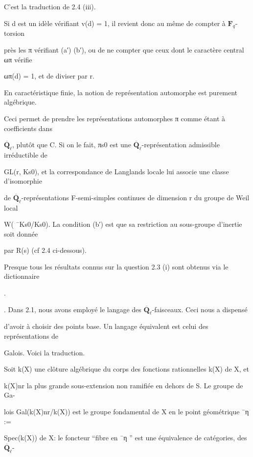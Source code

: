 \documentclass[11pt]{article}
\begin{document}
\noindent C’est la traduction de 2.4 (iii).\par
\noindent Si d est un idèle vérifiant v(d) = 1, il revient donc au même de compter à \(\mathbf F_q\)-torsion\par
\noindent près les π vérifiant (a′) (b′), ou de ne compter que ceux dont le caractère central ωπ vérifie\par
\noindent ωπ(d) = 1, et de diviser par r.\par
\medskip
\noindent En caractéristique finie, la notion de représentation automorphe est purement algébrique.\par
\noindent Ceci permet de prendre les représentations automorphes π comme étant à coefficients dans\par
\noindent \(\overline{\mathbf Q}_{\ell}\), plutôt que C. Si on le fait, πs0 est une \(\overline{\mathbf Q}_{\ell}\)-représentation admissible irréductible de\par
\noindent GL(r, Ks0), et la correspondance de Langlands locale lui associe une classe d’isomorphie\par
\noindent de \(\overline{\mathbf Q}_{\ell}\)-représentations F-semi-simples continues de dimension r du groupe de Weil local\par
\noindent W( ¯Ks0/Ks0). La condition (b′) est que sa restriction au sous-groupe d’inertie soit donnée\par
\noindent par R(s) (cf 2.4 ci-dessous).\par
\noindent Presque tous les résultats connus sur la question 2.3 (i) sont obtenus via le dictionnaire\par
{}.\par
{}. Dans 2.1, nous avons employé le langage des \(\overline{\mathbf Q}_{\ell}\)-faisceaux. Ceci nous a dispensé\par
\noindent d’avoir à choisir des points base. Un langage équivalent est celui des représentations de\par
\noindent Galois. Voici la traduction.\par
\noindent Soit k(X) une clôture algébrique du corps des fonctions rationnelles k(X) de X, et\par
\noindent k(X)nr la plus grande sous-extension non ramifiée en dehors de S. Le groupe de Ga-\par
\noindent lois Gal(k(X)nr/k(X)) est le groupe fondamental de X en le point géométrique ¯η :=\par
\noindent Spec(k(X)) de X: le foncteur “fibre en ¯η ” est une équivalence de catégories, des \(\overline{\mathbf Q}_{\ell}\)-\par
\end{document}
